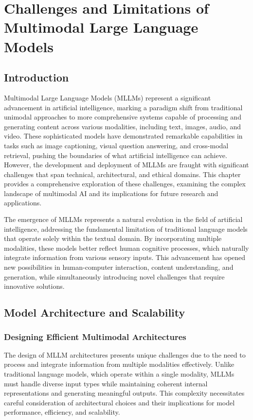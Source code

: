 \chapter{Challenges and Limitations of Multimodal Large Language Models}




\section{Introduction}
Multimodal Large Language Models (MLLMs) represent a significant advancement in artificial intelligence, marking a paradigm shift from traditional unimodal approaches to more comprehensive systems capable of processing and generating content across various modalities, including text, images, audio, and video. These sophisticated models have demonstrated remarkable capabilities in tasks such as image captioning, visual question answering, and cross-modal retrieval, pushing the boundaries of what artificial intelligence can achieve. However, the development and deployment of MLLMs are fraught with significant challenges that span technical, architectural, and ethical domains. This chapter provides a comprehensive exploration of these challenges, examining the complex landscape of multimodal AI and its implications for future research and applications.

The emergence of MLLMs represents a natural evolution in the field of artificial intelligence, addressing the fundamental limitation of traditional language models that operate solely within the textual domain. By incorporating multiple modalities, these models better reflect human cognitive processes, which naturally integrate information from various sensory inputs. This advancement has opened new possibilities in human-computer interaction, content understanding, and generation, while simultaneously introducing novel challenges that require innovative solutions.

\section{Model Architecture and Scalability}

\subsection{Designing Efficient Multimodal Architectures}
The design of MLLM architectures presents unique challenges due to the need to process and integrate information from multiple modalities effectively. Unlike traditional language models, which operate within a single modality, MLLMs must handle diverse input types while maintaining coherent internal representations and generating meaningful outputs. This complexity necessitates careful consideration of architectural choices and their implications for model performance, efficiency, and scalability.

